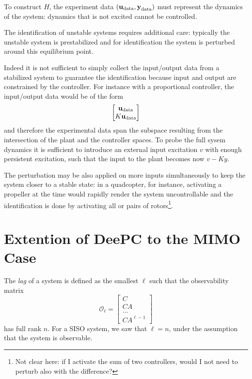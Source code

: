 To construct $H$, the experiment data $(\boldsymbol{\mathrm{u}}_\textrm{data},\boldsymbol{\mathrm{y}}_\textrm{data})$ must represent the dynamics of the system: dynamics that is not excited cannot be controlled.

The identification of unstable systems requires additional care: typically the unstable system is prestabilized and for identification the system is perturbed around this equilibrium point.

Indeed it is not sufficient to simply collect the input/output data from a stabilized system to guarantee the identification because input and output are constrained by the controller. For instance with a proportional controller, the input/output data would be of the form
\begin{equation*}
  \begin{bmatrix}
    \boldsymbol{\mathrm{u}}_\textrm{data} \\ K\boldsymbol{\mathrm{u}}_\textrm{data}
  \end{bmatrix}
\end{equation*}
and therefore the experimental data span the subspace resulting from the intersection of the plant and the controller spaces. To probe the full sysem dynamics it is sufficient to introduce an external input excitation $v$ with enough persistent excitation, such that the input to the plant becomes now $v - Ky$.

The perturbation may be also applied on more inputs simultaneously to keep the system closer to a stable state: in a quadcopter, for instance, activating a propeller at the time would rapidly render the system uncontrollable and the identification is done by activating all or pairs of rotors\footnote{Not clear here: if I activate the sum of two controllers, would I not need to perturb also with the difference?}.


\section{Extention of DeePC to the MIMO Case}

The \emph{lag} of a system is defined as the smallest $\ell$ such that the observability matrix
\begin{equation*}
  \mathcal{O}_\ell =
  \begin{bmatrix}
    C \\ CA \\ \ldots \\ CA^{\ell-1}
  \end{bmatrix}
\end{equation*}
has full rank $n$. For a SISO system, we saw that $\ell=n$, under the assumption that the system is observable.

